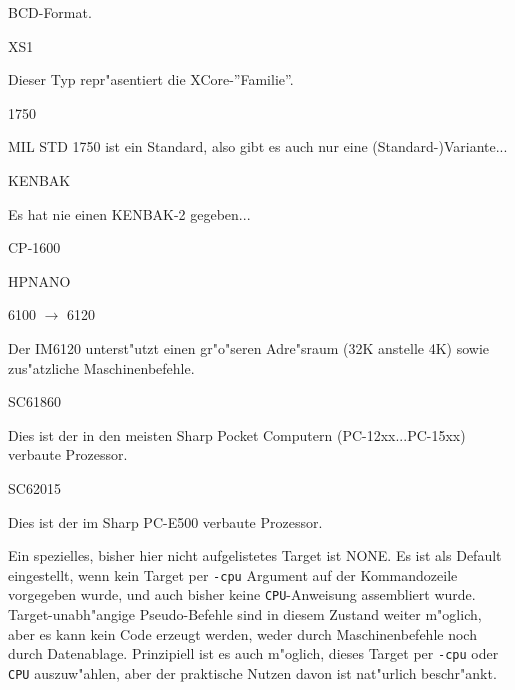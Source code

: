 \documentclass[12pt,a4paper,twoside]{report}
\begin{document}
BCD-Format.
\begin{cpulist}
   XS1
\end{cpulist}
Dieser Typ repr"asentiert die XCore-''Familie''.
\begin{cpulist}
   1750
\end{cpulist}
MIL STD 1750 ist ein Standard, also gibt es auch nur eine
(Standard-)Variante...
\begin{cpulist}
   KENBAK
\end{cpulist}
Es hat nie einen KENBAK-2 gegeben...
\begin{cpulist}
   CP-1600
\end{cpulist}
\begin{cpulist}
   HPNANO
\end{cpulist}
\begin{cpulist}
   6100 $\rightarrow$ 6120
\end{cpulist}
Der IM6120 unterst"utzt einen gr"o"seren Adre"sraum (32K
anstelle 4K) sowie zus"atzliche Maschinenbefehle.
\begin{cpulist}
   SC61860
\end{cpulist}
Dies ist der in den meisten Sharp Pocket Computern (PC-12xx...PC-15xx) verbaute
Prozessor.
\begin{cpulist}
   SC62015
\end{cpulist}
Dies ist der im Sharp PC-E500 verbaute Prozessor.

Ein spezielles, bisher hier nicht aufgelistetes Target ist
NONE.  Es ist als Default eingestellt, wenn kein Target
per {\tt -cpu} Argument auf der Kommandozeile vorgegeben
wurde, und auch bisher keine {\tt CPU}-Anweisung assembliert
wurde.  Target-unabh"angige Pseudo-Befehle sind in diesem
Zustand weiter m"oglich, aber es kann kein Code erzeugt
werden, weder durch Maschinenbefehle noch durch Datenablage.
Prinzipiell ist es auch m"oglich, dieses Target per {\tt -cpu}
oder {\tt CPU} auszuw"ahlen, aber der praktische Nutzen davon
ist nat"urlich beschr"ankt.
\end{document}
